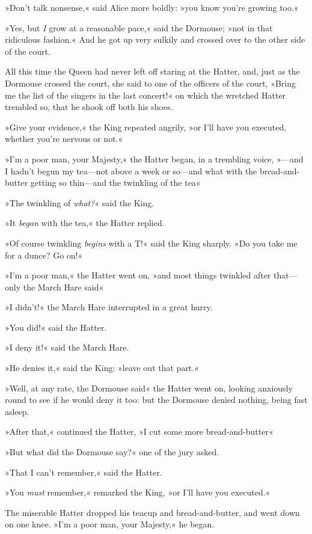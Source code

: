 »Don't talk nonsense,« said Alice more boldly: »you know you're growing too.«

»Yes, but \textit{I} grow at a reasonable pace,« said the Dormouse; »not in that ridiculous fashion.« And he got up very sulkily and crossed over to the other side of the court.

All this time the Queen had never left off staring at the Hatter, and, just as the Dormouse crossed the court, she said to one of the officers of the court, »Bring me the list of the singers in the last concert!« on which the wretched Hatter trembled so, that he shook off both his shoes.

»Give your evidence,« the King repeated angrily, »or I'll have you executed, whether you're nervous or not.«

»I'm a poor man, your Majesty,« the Hatter began, in a trembling voice, »—and I hadn't begun my tea—not above a week or so—and what with the bread-and-butter getting so thin—and the twinkling of the tea\longdash«

»The twinkling of \textit{what?}« said the King.

»It \textit{began} with the tea,« the Hatter replied.

»Of course twinkling \textit{begins} with a T\@!« said the King sharply. »Do you take me for a dunce? Go on!«

»I'm a poor man,« the Hatter went on, »and most things twinkled after that—only the March Hare said\longdash«

»I didn't!« the March Hare interrupted in a great hurry.

»You did!« said the Hatter.

»I deny it!« said the March Hare.

»He denies it,« said the King: »leave out that part.«

»Well, at any rate, the Dormouse said\longdash« the Hatter went on, looking anxiously round to see if he would deny it too: but the Dormouse denied nothing, being fast asleep.

»After that,« continued the Hatter, »I cut some more bread-and-butter\longdash«

»But what did the Dormouse say?« one of the jury asked.

»That I can't remember,« said the Hatter.

»You \textit{must} remember,« remarked the King, »or I'll have you executed.«

The miserable Hatter dropped his teacup and bread-and-butter, and went down on one knee. »I'm a poor man, your Majesty,« he began.

